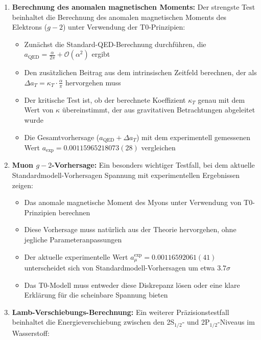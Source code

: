 \documentclass[12pt,a4paper]{article}
\begin{document}
	\begin{enumerate}
		\item \textbf{Berechnung des anomalen magnetischen Moments:} Der strengste Test beinhaltet die Berechnung des anomalen magnetischen Moments des Elektrons ($g-2$) unter Verwendung der T0-Prinzipien:
		
		\begin{itemize}
			\item Zunächst die Standard-QED-Berechnung durchführen, die $a_{\text{QED}} = \frac{\alpha}{2\pi} + \mathcal{O}(\alpha^2)$ ergibt
			\item Den zusätzlichen Beitrag aus dem intrinsischen Zeitfeld berechnen, der als $\Delta a_{T} = \kappa_T \cdot \frac{\alpha}{\pi}$ hervorgehen muss
			\item Der kritische Test ist, ob der berechnete Koeffizient $\kappa_T$ genau mit dem Wert von $\kappa$ übereinstimmt, der aus gravitativen Betrachtungen abgeleitet wurde
			\item Die Gesamtvorhersage ($a_{\text{QED}} + \Delta a_{T}$) mit dem experimentell gemessenen Wert $a_{\text{exp}} = 0.00115965218073(28)$ vergleichen \cite{Hanneke2008}
		\end{itemize}
		
		\item \textbf{Muon $g-2$-Vorhersage:} Ein besonders wichtiger Testfall, bei dem aktuelle Standardmodell-Vorhersagen Spannung mit experimentellen Ergebnissen zeigen:
		
		\begin{itemize}
			\item Das anomale magnetische Moment des Myons unter Verwendung von T0-Prinzipien berechnen
			\item Diese Vorhersage muss natürlich aus der Theorie hervorgehen, ohne jegliche Parameteranpassungen
			\item Der aktuelle experimentelle Wert $a_{\mu}^{\text{exp}} = 0.00116592061(41)$ \cite{Muong-2:2021ojo} unterscheidet sich von Standardmodell-Vorhersagen um etwa $3.7\sigma$
			\item Das T0-Modell muss entweder diese Diskrepanz lösen oder eine klare Erklärung für die scheinbare Spannung bieten
		\end{itemize}
		
		\item \textbf{Lamb-Verschiebungs-Berechnung:} Ein weiterer Präzisionstestfall beinhaltet die Energieverschiebung zwischen den 2S$_{1/2}$- und 2P$_{1/2}$-Niveaus im Wasserstoff:
		

\end{enumerate}
\end{document}
